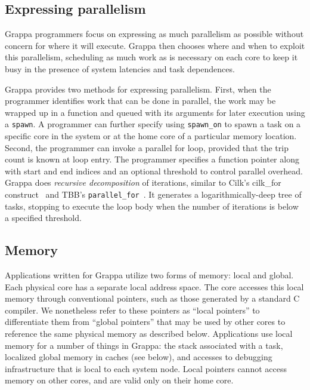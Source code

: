 \subsection{Expressing parallelism}

Grappa programmers focus on expressing as much parallelism as possible without concern for where it will execute. Grappa then chooses where and when to exploit this parallelism, scheduling as much work as is necessary on each core to keep it busy in the presence of system latencies and task dependences.

Grappa provides two methods for expressing parallelism. First, when the programmer identifies work that can be done in parallel, the work may be wrapped up in a function and queued with its arguments for later execution using a \texttt{spawn}. A programmer can further specify using \texttt{spawn\_on} to spawn a task on a specific core in the system or at the home core of a particular memory location. Second, the programmer can invoke a parallel for loop, provided that the trip count is known at loop entry. The programmer specifies a function pointer along with start and end indices and an optional threshold to control parallel overhead. Grappa does {\em recursive decomposition} of iterations, similar to Cilk's cilk\_for construct~\cite {cilkforimplementation} and TBB's {\tt parallel\_for}~\cite{intel_tbb}.  It generates a logarithmically-deep tree of tasks, stopping to execute the loop body when the number of iterations is below a specified threshold.

\subsection{Memory}

Applications written for Grappa utilize two forms of memory: local and global.  Each physical core has a separate local address space.  The core accesses this local memory through conventional pointers, such as those generated by a standard C compiler.  We nonetheless refer to these pointers as ``local pointers'' to differentiate them from ``global pointers'' that may be used by other cores to reference the same physical memory as described below.  Applications use local memory for a number of things in Grappa: the stack associated with a task, localized global memory in caches (see below), and accesses to debugging infrastructure that is local to each system node.  Local pointers cannot access memory on other cores, and are valid only on their home core.

